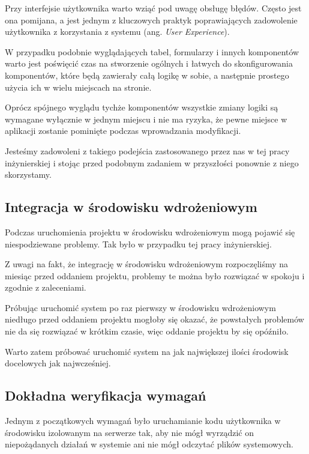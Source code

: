 \documentclass[a4paper,11pt,twoside]{report}
\theoremstyle{definition}
\begin{document}
            Przy interfejsie użytkownika warto wziąć pod uwagę obsługę błędów. Często jest ona pomijana, a jest jednym z kluczowych praktyk poprawiających zadowolenie użytkownika z korzystania z systemu (ang. \textit{User Experience}).
            
            W przypadku podobnie wyglądających tabel, formularzy i innych komponentów warto jest poświęcić czas na stworzenie ogólnych i łatwych do skonfigurowania komponentów, które będą zawierały całą logikę w sobie, a następnie prostego użycia ich w wielu miejscach na stronie.
            
            Oprócz spójnego wyglądu tychże komponentów wszystkie zmiany logiki są wymagane wyłącznie w jednym miejscu i nie ma ryzyka, że pewne miejsce w aplikacji zostanie pominięte podczas wprowadzania modyfikacji.
            
            Jesteśmy zadowoleni z takiego podejścia zastosowanego przez nas w tej pracy inżynierskiej i stojąc przed podobnym zadaniem w przyszłości ponownie z niego skorzystamy.
        
        \subsection{Integracja w środowisku wdrożeniowym}
            Podczas uruchomienia projektu w środowisku wdrożeniowym mogą pojawić się niespodziewane problemy. Tak było w przypadku tej pracy inżynierskiej.
            
            Z uwagi na fakt, że integrację w środowisku wdrożeniowym rozpoczęliśmy na miesiąc przed oddaniem projektu, problemy te można było rozwiązać w spokoju i zgodnie z zaleceniami.
            
            Próbując uruchomić system po raz pierwszy w środowisku wdrożeniowym niedługo przed oddaniem projektu mogłoby się okazać, że powstałych problemów nie da się rozwiązać w krótkim czasie, więc oddanie projektu by się opóźniło.
            
            Warto zatem próbować uruchomić system na jak największej ilości środowisk docelowych jak najwcześniej.
            
        \subsection{Dokładna weryfikacja wymagań}
            Jednym z początkowych wymagań było uruchamianie kodu użytkownika w środowisku izolowanym na serwerze tak, aby nie mógł wyrządzić on niepożądanych działań w systemie ani nie mógł odczytać plików systemowych.
            
\end{document}

